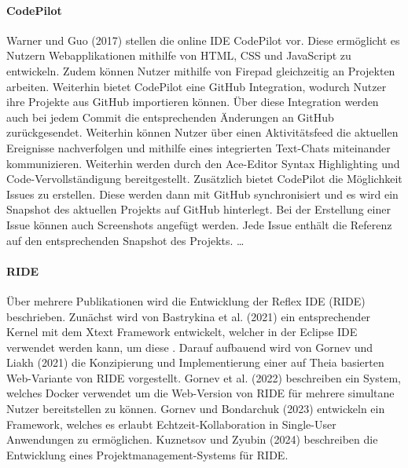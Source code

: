 \paragraph{CodePilot}
Warner und Guo (2017) \cite{warner_codepilot_2017} stellen die online IDE CodePilot vor. Diese ermöglicht es Nutzern Webapplikationen mithilfe von HTML, CSS und JavaScript zu entwickeln. Zudem können Nutzer mithilfe von Firepad  gleichzeitig an Projekten arbeiten. Weiterhin bietet CodePilot eine GitHub  Integration, wodurch Nutzer ihre Projekte aus GitHub importieren können. Über diese Integration werden auch bei jedem Commit die entsprechenden Änderungen an GitHub zurückgesendet. Weiterhin können Nutzer über einen Aktivitätsfeed die aktuellen Ereignisse nachverfolgen und mithilfe eines integrierten Text-Chats miteinander kommunizieren. Weiterhin werden durch den Ace-Editor \cite{noauthor_ace_nodate} Syntax Highlighting und Code-Vervollständigung bereitgestellt. Zusätzlich bietet CodePilot die Möglichkeit Issues zu erstellen. Diese werden dann mit GitHub synchronisiert und es wird ein Snapshot des aktuellen Projekts auf GitHub hinterlegt. Bei der Erstellung einer Issue können auch Screenshots angefügt werden. Jede Issue enthält die Referenz auf den entsprechenden Snapshot des Projekts. \dots {}

\paragraph{RIDE}
Über mehrere Publikationen wird die Entwicklung der Reflex IDE (RIDE) beschrieben.  Zunächst wird von Bastrykina et al. (2021) \cite{bastrykina_developing_2021} ein entsprechender Kernel mit dem Xtext Framework \cite{noauthor_xtext_nodate} entwickelt, welcher in der Eclipse IDE verwendet werden kann, um diese \todo{}. Darauf aufbauend wird von Gornev und Liakh (2021) \cite{gornev_ride_2021} die Konzipierung und Implementierung einer auf Theia basierten Web-Variante von RIDE vorgestellt. Gornev et al. (2022) \cite{gornev_towards_2022} beschreiben ein System, welches Docker verwendet um die Web-Version von RIDE für mehrere simultane Nutzer bereitstellen zu können. Gornev und Bondarchuk (2023) \cite{gornev_towards_2023} entwickeln ein Framework, welches es erlaubt Echtzeit-Kollaboration in Single-User Anwendungen zu ermöglichen. Kuznetsov und Zyubin (2024) \cite{kuznetsov_development_2024} beschreiben die Entwicklung eines Projektmanagement-Systems für RIDE. 

